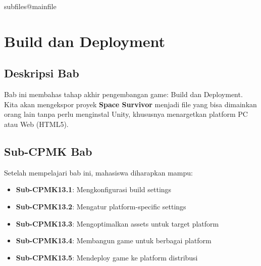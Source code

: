 \documentclass[../../main.tex]{subfiles}
\begin{document}
\ifcsname subfiles@mainfile\endcsname\else
    \setcounter{chapter}{12}
\fi
\chapter{Build dan Deployment}

\section{Deskripsi Bab}

Bab ini membahas tahap akhir pengembangan game: Build dan Deployment. 
Kita akan mengekspor proyek \textbf{Space Survivor} menjadi file yang bisa dimainkan orang lain tanpa perlu menginstal Unity, khususnya menargetkan platform PC atau Web (HTML5).

\section{Sub-CPMK Bab}

Setelah mempelajari bab ini, mahasiswa diharapkan mampu:
\begin{itemize}
\item \textbf{Sub-CPMK13.1}: Mengkonfigurasi build settings
\item \textbf{Sub-CPMK13.2}: Mengatur platform-specific settings
\item \textbf{Sub-CPMK13.3}: Mengoptimalkan assets untuk target platform
\item \textbf{Sub-CPMK13.4}: Membangun game untuk berbagai platform
\item \textbf{Sub-CPMK13.5}: Mendeploy game ke platform distribusi
\end{itemize}









\end{document}
